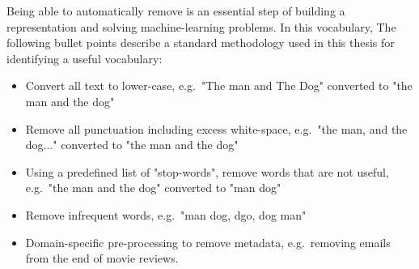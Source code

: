 



Being able to automatically remove  is an essential step of building a representation and solving machine-learning problems.   In this vocabulary,   The following bullet points describe a standard methodology used in this thesis for identifying a useful vocabulary: %

\begin{itemize}
	\item  Convert all text to lower-case, e.g.\ "The man and The Dog" converted to "the man and the dog"
	\item  Remove all punctuation including excess white-space, e.g.\ "the man, and the dog..." converted to "the man and the dog"
	\item Using a predefined list of "stop-words", remove words that are not useful, e.g.\ "the man and the dog" converted to "man dog"
	\item Remove infrequent words, e.g.\ "man dog, dgo, dog man" 
	\item Domain-specific pre-processing to remove metadata, e.g.\ removing emails from the end of movie reviews.
\end{itemize}






